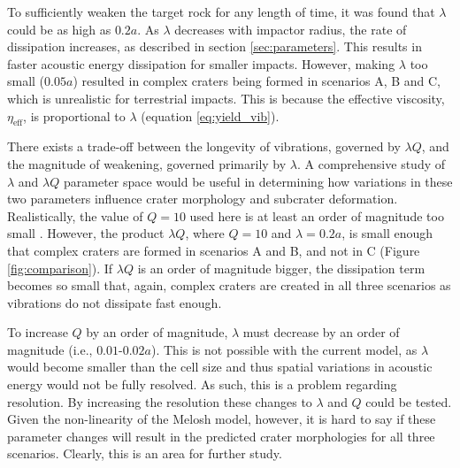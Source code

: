 To sufficiently weaken the target rock for any length of time, it was found that  $\lambda$ could be as high as $0.2a$. As $\lambda$ decreases with impactor radius, the rate of dissipation increases, as described in section \ref{sec:parameters}. This results in faster acoustic energy dissipation for smaller impacts. However, making $\lambda$ too small ($0.05a$) resulted in complex craters being formed in scenarios A, B and C, which is unrealistic for terrestrial impacts. This is because the effective viscosity, $\eta_{\text{eff}}$, is proportional to $\lambda$ (equation \ref{eq:yield_vib}).

There exists a trade-off between the longevity of vibrations, governed by $\lambda Q$, and the magnitude of weakening, governed primarily by $\lambda$. A comprehensive study of $\lambda$ and $\lambda Q$ parameter space would be useful in determining how variations in these two parameters influence crater morphology and subcrater deformation. Realistically, the value of $Q=10$ used here is at least an order of magnitude too small \citep{melosh1996dynamical,anderson1989theory}. However, the product $\lambda Q$, where $Q=10$ and $\lambda = 0.2a$, is small enough that complex craters are formed in scenarios A and B, and not in C (Figure \ref{fig:comparison}). If $\lambda Q$ is an order of magnitude bigger, the dissipation term becomes so small that, again, complex craters are created in all three scenarios as vibrations do not dissipate fast enough.

To increase $Q$ by an order of magnitude, $\lambda$ must decrease by an order of magnitude (i.e., $0.01$-$0.02a$). This is not possible with the current model, as $\lambda$ would become smaller than the cell size and thus spatial variations in acoustic energy would not be fully resolved. As such, this is a problem regarding resolution. By increasing the resolution these changes to $\lambda$ and $Q$ could be tested. Given the non-linearity of the Melosh model, however, it is hard to say if these parameter changes will result in the predicted crater morphologies for all three scenarios. Clearly, this is an area for further study.